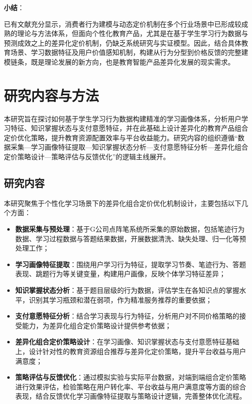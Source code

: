 \textbf{小结}：

已有文献充分显示，消费者行为建模与动态定价机制在多个行业场景中已形成较成熟的理论与方法体系，但面向个性化教育产品，尤其是在基于学生学习行为数据与预测成效之上的差异化定价机制，仍缺乏系统研究与实证模型。因此，结合具体教育场景、学习数据特征及用户价值感知机制，构建从行为分型到价格反馈的完整建模链条，既是理论发展的新方向，也是教育智能产品差异化发展的现实需求。
\section{研究内容与方法}

本研究旨在探讨如何基于学生学习行为数据构建精准的学习画像体系，分析用户学习特征、知识掌握状态与支付意愿特征，并在此基础上设计差异化的教育产品组合定价优化策略，提升教育资源配置效率与平台收益能力。研究内容的组织遵循“数据采集—学习画像特征提取—知识掌握状态分析—支付意愿特征分析—差异化组合定价策略设计—策略评估与反馈优化”的逻辑主线展开。

\subsection{研究内容}

本研究聚焦于个性化学习场景下的差异化组合定价优化机制设计，主要包括以下几个方面：

\begin{itemize}
\item \textbf{数据采集与预处理}：基于G公司点阵笔系统所采集的原始数据，包括笔迹行为数据、学习过程数据与答题结果数据，开展数据清洗、缺失处理、归一化等预处理工作；
\item \textbf{学习画像特征提取}：围绕用户学习行为特征，提取学习节奏、笔迹行为、答题表现、跳题行为等关键变量，构建用户画像，反映个体学习特征差异；
\item \textbf{知识掌握状态分析}：基于题目层级的行为数据，评估学生在各知识点的掌握水平，识别其学习瓶颈和潜在弱项，作为精准服务推荐的重要依据；
\item \textbf{支付意愿特征分析}：结合学习表现与行为特征，分析用户对不同价格策略的接受能力，为差异化组合定价策略设计提供参考依据；
\item \textbf{差异化组合定价策略设计}：在学习画像、知识掌握状态与支付意愿特征基础上，设计针对性的教育资源组合推荐与差异化定价策略，提升平台收益与用户满意度；
\item \textbf{策略评估与反馈优化}：通过模拟实验与实际平台数据，对端到端组合定价策略进行效果评估，检验策略在用户转化率、平台收益与用户满意度等方面的综合表现，结合反馈优化学习画像特征提取与策略设计逻辑，完善整体优化流程。
\end{itemize}

